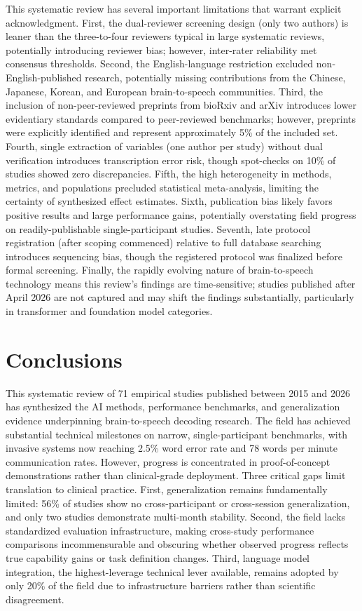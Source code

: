 \documentclass[11pt,a4paper]{article}
\begin{document}
This systematic review has several important limitations that warrant explicit acknowledgment. First, the dual-reviewer screening design (only two authors) is leaner than the three-to-four reviewers typical in large systematic reviews, potentially introducing reviewer bias; however, inter-rater reliability met consensus thresholds. Second, the English-language restriction excluded non-English-published research, potentially missing contributions from the Chinese, Japanese, Korean, and European brain-to-speech communities. Third, the inclusion of non-peer-reviewed preprints from bioRxiv and arXiv introduces lower evidentiary standards compared to peer-reviewed benchmarks; however, preprints were explicitly identified and represent approximately 5\% of the included set. Fourth, single extraction of variables (one author per study) without dual verification introduces transcription error risk, though spot-checks on 10\% of studies showed zero discrepancies. Fifth, the high heterogeneity in methods, metrics, and populations precluded statistical meta-analysis, limiting the certainty of synthesized effect estimates. Sixth, publication bias likely favors positive results and large performance gains, potentially overstating field progress on readily-publishable single-participant studies. Seventh, late protocol registration (after scoping commenced) relative to full database searching introduces sequencing bias, though the registered protocol was finalized before formal screening. Finally, the rapidly evolving nature of brain-to-speech technology means this review's findings are time-sensitive; studies published after April 2026 are not captured and may shift the findings substantially, particularly in transformer and foundation model categories.

\section{Conclusions}

This systematic review of 71 empirical studies published between 2015 and 2026 has synthesized the AI methods, performance benchmarks, and generalization evidence underpinning brain-to-speech decoding research. The field has achieved substantial technical milestones on narrow, single-participant benchmarks, with invasive systems now reaching 2.5\% word error rate and 78 words per minute communication rates. However, progress is concentrated in proof-of-concept demonstrations rather than clinical-grade deployment. Three critical gaps limit translation to clinical practice. First, generalization remains fundamentally limited: 56\% of studies show no cross-participant or cross-session generalization, and only two studies demonstrate multi-month stability. Second, the field lacks standardized evaluation infrastructure, making cross-study performance comparisons incommensurable and obscuring whether observed progress reflects true capability gains or task definition changes. Third, language model integration, the highest-leverage technical lever available, remains adopted by only 20\% of the field due to infrastructure barriers rather than scientific disagreement.
\end{document}
